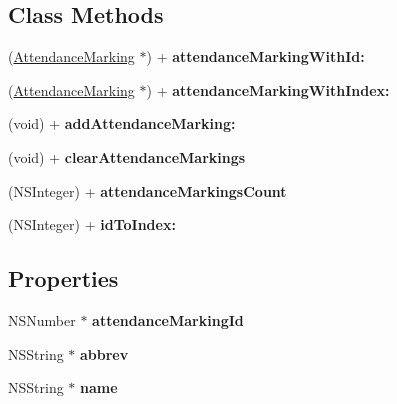 \subsection*{Class Methods}
\begin{DoxyCompactItemize}
\item 
\hypertarget{interface_attendance_marking_a8433859ec71fc8803abc240a003f3810}{(\hyperlink{interface_attendance_marking}{Attendance\+Marking} $\ast$) + {\bfseries attendance\+Marking\+With\+Id\+:}}\label{interface_attendance_marking_a8433859ec71fc8803abc240a003f3810}

\item 
\hypertarget{interface_attendance_marking_a864de84c57b2c40cab4c11f81b593049}{(\hyperlink{interface_attendance_marking}{Attendance\+Marking} $\ast$) + {\bfseries attendance\+Marking\+With\+Index\+:}}\label{interface_attendance_marking_a864de84c57b2c40cab4c11f81b593049}

\item 
\hypertarget{interface_attendance_marking_a8b7521298b1e5f2da13a553c07b96641}{(void) + {\bfseries add\+Attendance\+Marking\+:}}\label{interface_attendance_marking_a8b7521298b1e5f2da13a553c07b96641}

\item 
\hypertarget{interface_attendance_marking_aac7841ec88daef3846aef57eb3aef678}{(void) + {\bfseries clear\+Attendance\+Markings}}\label{interface_attendance_marking_aac7841ec88daef3846aef57eb3aef678}

\item 
\hypertarget{interface_attendance_marking_a18d628d46cf571cb46ac74e514903d88}{(N\+S\+Integer) + {\bfseries attendance\+Markings\+Count}}\label{interface_attendance_marking_a18d628d46cf571cb46ac74e514903d88}

\item 
\hypertarget{interface_attendance_marking_a47c3e10b3de328a9acac4b61394e4751}{(N\+S\+Integer) + {\bfseries id\+To\+Index\+:}}\label{interface_attendance_marking_a47c3e10b3de328a9acac4b61394e4751}

\end{DoxyCompactItemize}
\subsection*{Properties}
\begin{DoxyCompactItemize}
\item 
\hypertarget{interface_attendance_marking_a211012d0e662142f3b002b57f133b0db}{N\+S\+Number $\ast$ {\bfseries attendance\+Marking\+Id}}\label{interface_attendance_marking_a211012d0e662142f3b002b57f133b0db}

\item 
\hypertarget{interface_attendance_marking_af637cdd49ba462876b3fe6e6957049fc}{N\+S\+String $\ast$ {\bfseries abbrev}}\label{interface_attendance_marking_af637cdd49ba462876b3fe6e6957049fc}

\item 
\hypertarget{interface_attendance_marking_a235155acb5a8b489b9829a09b6ac4b93}{N\+S\+String $\ast$ {\bfseries name}}\label{interface_attendance_marking_a235155acb5a8b489b9829a09b6ac4b93}

\end{DoxyCompactItemize}


